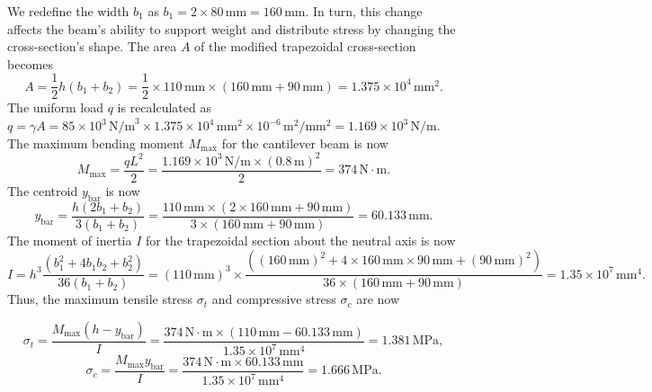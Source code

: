 \documentclass[12pt]{article}
\begin{document}
We redefine the width \(b_1\) as \(b_1 = 2 \times 80 \, \text{mm} = 160 \, \text{mm}\). In turn, this change affects the beam's ability to support weight and distribute stress by changing the cross-section's shape. The area \(A\) of the modified trapezoidal cross-section becomes \[ A = \frac{1}{2} h (b_1 + b_2) = \frac{1}{2} \times 110 \, \text{mm} \times (160 \, \text{mm} + 90 \, \text{mm}) = 1.375 \times 10^4 \, \text{mm}^2. \] The uniform load \(q\) is recalculated as \( q = \gamma A = 85 \times 10^3 \, \text{N/m}^3 \times 1.375 \times 10^4 \, \text{mm}^2 \times 10^{-6} \, \text{m}^2/\text{mm}^2 = 1.169 \times 10^3 \, \text{N/m}. \) The maximum bending moment \(M_{\text{max}}\) for the cantilever beam is now \[ M_{\text{max}} = \frac{q L^2}{2} = \frac{1.169 \times 10^3 \, \text{N/m} \times (0.8 \, \text{m})^2}{2} = 374 \, \text{N} \cdot \text{m}. \] The centroid \(y_{\text{bar}}\) is now \[ y_{\text{bar}} = \frac{h(2b_1 + b_2)}{3(b_1 + b_2)} = \frac{110 \, \text{mm} \times (2 \times 160 \, \text{mm} + 90 \, \text{mm})}{3 \times (160 \, \text{mm} + 90 \, \text{mm})} = 60.133 \, \text{mm}. \] The moment of inertia \(I\) for the trapezoidal section about the neutral axis is now \[ I = h^3 \frac{(b_1^2 + 4b_1b_2 + b_2^2)}{36(b_1 + b_2)} = (110 \, \text{mm})^3 \times\frac{((160 \, \text{mm})^2 + 4 \times 160 \, \text{mm} \times 90 \, \text{mm} + (90 \, \text{mm})^2)}{36 \times (160 \, \text{mm} + 90 \, \text{mm})} = 1.35 \times 10^7 \, \text{mm}^4. \] Thus, the maximum tensile stress \( \sigma_t \) and compressive stress \( \sigma_c \) are now

\[ \sigma_t = \frac{M_{\text{max}}(h - y_{\text{bar}})}{I} = \frac{374 \, \text{N} \cdot \text{m} \times (110 \, \text{mm} - 60.133 \, \text{mm})}{1.35 \times 10^7 \, \text{mm}^4} = 1.381 \, \text{MPa}, \]
\[ \sigma_c = \frac{M_{\text{max}} y_{\text{bar}}}{I} = \frac{374 \, \text{N} \cdot \text{m} \times 60.133 \, \text{mm}}{1.35 \times 10^7 \, \text{mm}^4} = 1.666 \, \text{MPa}. \]
\AnswerTag
\end{document}
